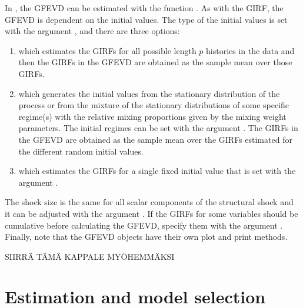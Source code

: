 \documentclass[nojss]{jss} %
\begin{document}
In , the GFEVD can be estimated with the function . As with the GIRF, the GFEVD is dependent on the initial values. The type of the initial values is set with the argument , and there are three options:
\begin{enumerate}
\item {} which estimates the GIRFs for all possible length $p$ histories in the data and then the GIRFs in the GFEVD are obtained as the sample mean over those GIRFs.
\item {} which generates the initial values from the stationary distribution of the process or from the mixture of the stationary distributions of some specific regime(s) with the relative mixing proportions given by the mixing weight parameters. The initial regimes can be set with the argument . The GIRFs in the GFEVD are obtained as the sample mean over the GIRFs estimated for the different random initial values.
\item {} which estimates the GIRFs for a single fixed initial value that is set with the argument .
\end{enumerate}
The shock size is the same for all scalar components of the structural shock and it can be adjusted with the argument . If the GIRFs for some variables should be cumulative before calculating the GFEVD, specify them with the argument . Finally, note that the GFEVD objects have their own plot and print methods.

SIIRRÄ TÄMÄ KAPPALE MYÖHEMMÄKSI

\section{Estimation and model selection}\label{sec:estimation}
\end{document}
